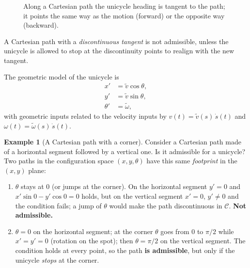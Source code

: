 \documentclass[11pt,a4paper]{article}
\newcommand{\vt}{\tilde v}
\newcommand{\wt}{\tilde\omega}
\theoremstyle{definition}
\newtheorem{example}[definition]{Example}
\theoremstyle{plain}
\theoremstyle{remark}
\begin{document}
\begin{figure}[h]
\centering
{}
\caption{Along a Cartesian path the unicycle heading is tangent to the path; it points the same way as the motion
(forward) or the opposite way (backward).}
\end{figure}

A Cartesian path with a \emph{discontinuous tangent} is not admissible, unless the unicycle is allowed to stop at the
discontinuity points to realign with the new tangent.

The geometric model of the unicycle is
\begin{align}
x'&=\vt\cos\theta,\nonumber\\
y'&=\vt\sin\theta,\\
\theta'&=\wt,\nonumber
\end{align}
with geometric inputs related to the velocity inputs by $v(t)=\vt(s)\,\dot s(t)$ and $\omega(t)=\wt(s)\,\dot s(t)$.
\begin{example}[A Cartesian path with a corner]\label{ex:corner}
Consider a Cartesian path made of a horizontal segment followed by a vertical one. Is it admissible for a unicycle? Two paths in
the configuration space $(x,y,\theta)$ have this same \emph{footprint} in the $(x,y)$ plane:
\begin{enumerate}[nosep,label=(\arabic*)]
\item $\theta$ stays at $0$ (or jumps at the corner). On the horizontal segment $y'=0$ and $x'\sin 0-y'\cos 0=0$ holds, but on the
vertical segment $x'=0$, $y'\ne0$ and the condition fails; a jump of $\theta$ would make the path discontinuous in $\mathcal C$.
\textbf{Not admissible.}
\item $\theta=0$ on the horizontal segment; at the corner $\theta$ goes from $0$ to $\pi/2$ while $x'=y'=0$ (rotation on the spot);
then $\theta=\pi/2$ on the vertical segment. The condition holds at every point, so the path \textbf{is admissible}, but only
if the unicycle \emph{stops} at the corner.
\end{enumerate}
\end{example}
\end{document}

